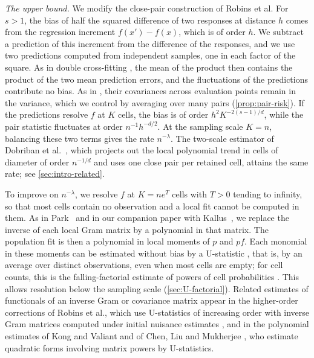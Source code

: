 \emph{The upper bound.} We modify the close-pair construction of
Robins et al. For $s>1$, the bias of half the squared difference of two
responses at distance $h$ comes from the regression increment
$f(x')-f(x)$, which is of order $h$. We subtract a prediction of this
increment from the difference of the responses, and we use two
predictions computed from independent samples, one in each factor of
the square. As in double cross-fitting \cite[Section~2]{NeweyRobins2018},
the mean of the product then contains the product of the two mean
prediction errors, and the fluctuations of the predictions contribute
no bias. As in \cite[Section~3]{McCleanEtAl2024}, their covariances
across evaluation points remain in the variance, which we control by
averaging over many pairs (\cref{prop:pair-risk}). If the predictions
resolve $f$ at $K$ cells, the bias is of order $h^2K^{-2(s-1)/d}$,
while the pair statistic fluctuates at order $n^{-1}h^{-d/2}$. At the
sampling scale $K=n$, balancing these two terms gives the rate
$n^{-\lambda}$. The two-scale estimator of Dobriban et al.\
\cite{DobribanEtAl2026}, which projects out the local polynomial trend
in cells of diameter of order $n^{-1/d}$ and uses one close pair per
retained cell, attains the same rate; see \cref{sec:intro-related}.

To improve on $n^{-\lambda}$, we resolve $f$ at $K=ne^T$ cells with
$T>0$ tending to infinity, so that most cells contain no observation
and a local fit cannot be computed in them. As in Park~\cite[Section~3.2, equations~(9)--(14)]{Park2026} and in
our companion paper with
Kallus~\cite[Sections~4.1--4.3]{AronowKallusLopatto2026}, we replace the inverse of each local Gram matrix by a polynomial in
that matrix. The population fit is then a polynomial in local moments
of $p$ and $pf$. Each monomial in
these moments can be estimated without bias by a U-statistic
\cite{Hoeffding1948}, that is, by an average over distinct observations,
even when most cells are empty; for cell counts, this is the
falling-factorial estimate of powers of cell probabilities
\cite[equation~(21)]{JiaoEtAl2015}. This allows resolution below the
sampling scale (\cref{sec:U-factorial}). Related estimates of
functionals of an inverse Gram or covariance matrix appear in the
higher-order corrections of Robins et al., which use U-statistics of
increasing order with inverse Gram matrices computed under initial
nuisance estimates
\cite[Theorems~3.14--3.15]{RobinsEtAl2008}, and in the polynomial
estimates of Kong and Valiant \cite[Section~2.2]{KongValiant2018} and
of Chen, Liu and Mukherjee \cite[Section~3.2]{ChenLiuMukherjee2024},
who estimate quadratic forms involving matrix powers by U-statistics.

